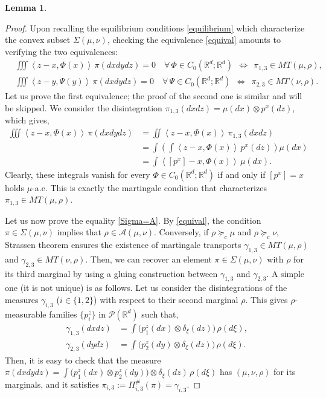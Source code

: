 \documentclass[11pt,letterpaper,reqno]{amsart}
\newtheorem{lemma}[theorem]{Lemma}
\theoremstyle{definition}
\numberwithin{equation}{section}
\newcommand{\R}{\mathbb{R}}
\newcommand{\A}{\mathcal{A}}
\newcommand{\PP}{\mathcal{P}}
\newcommand{\pairing}[1]{{\left \langle #1 \right \rangle}}
\begin{document}
{\begin{lemma}
\end{lemma}

\begin{proof} Upon recalling the equilibrium conditions \eqref{equilibrium} which characterize the convex subset $\Sigma(\mu,\nu)$,
checking the equivalence  \eqref{equival} amounts to verifying  the two equivalences:
\begin{align*}
	 &\iiint  \pairing{z-x, \Phi(x)} \, \pi(dxdydz) = 0\quad \forall\, \Phi\in C_0(\R^d;\R^d) \ \   \Leftrightarrow \ \    \pi_{1,3}\in MT(\mu,\rho), \\
	 & \iiint  \pairing{z-y, \Psi(y)} \, \pi(dxdydz) = 0 \quad  \forall\, \Psi\in C_0(\R^d;\R^d) \ \   \Leftrightarrow \ \    \pi_{2,3}\in MT(\nu,\rho) .
\end{align*}
Let us prove the first equivalence; the proof of the second one is similar and will be skipped. We consider the disintegration $\pi_{1,3}(dxdz) = \mu(dx) \otimes p^x(dz)$, which gives,
\begin{align*} \iiint  \pairing{z-x, \Phi(x)} \, \pi(dxdydz) &= \iint \pairing{z-x, \Phi(x)}\, \pi_{1,3}(dxdz) \\
&=  \int \left(\int\pairing{z-x, \Phi(x)}\, p^x(dz)\right)  \mu(dx) \\ &= \int \pairing{[p^x]-x, \Phi(x)} \, \mu(dx) .
\end{align*}  
Clearly, these integrals vanish for every $\Phi\in C_0(\R^d;\R^d)$ if and only if $[p^x]=x$ holds $\mu$-a.e. This is exactly the martingale condition that characterizes $\pi_{1,3}\in MT(\mu,\rho)$.

Let us now prove the equality  \eqref{Sigma=A}. 
By \eqref{equival}, the condition $\pi\in \Sigma(\mu,\nu)$ implies that $\rho\in\A(\mu,\nu)$. Conversely, if
$\rho \succeq_c \mu$ and $\rho \succeq_c \nu$, Strassen theorem ensures  the existence of martingale transports 
$\gamma_{1,3}\in MT(\mu,\rho)$ and $ \gamma_{2,3}\in MT(\nu,\rho)$. Then, we can recover an element $\pi\in \Sigma(\mu,\nu)$
with $\rho$ for its third marginal by using a gluing construction between $\gamma_{1,3}$ and $\gamma_{2,3}$. A simple one (it is not unique)  is as follows. Let us  consider the disintegrations of the measures $\gamma_{i,3} $ ($i\in\{1,2\}$) with respect to their second  marginal $\rho$. This gives $\rho$-measurable families $\{p_i^z\}$ in $\PP(\R^d)$ such that,
\begin{align*}
	\gamma_{1,3}(dxdz) &= \int \big( p_1^z(dx) \otimes \delta_\xi(dz)\big) \, \rho(d\xi), \\
	\gamma_{2,3}(dydz) &= \int  \big(p_2^z(dy) \otimes \delta_\xi(dz)\big) \,  \rho(d\xi).
\end{align*}
 Then, it is easy to check that the measure  $\pi(dxdydz)= \int  \big(p_1^z(dx)\otimes p_2^z(dy)\big)\otimes \delta_\xi(dz)\, \rho(d\xi)$ has $(\mu,\nu,\rho)$ for its marginals, and it satisfies {$\pi_{i,3}:=\Pi_{i,3}^\#(\pi) = \gamma_{i,3}$}.  
\end{proof}


}
\end{document}
